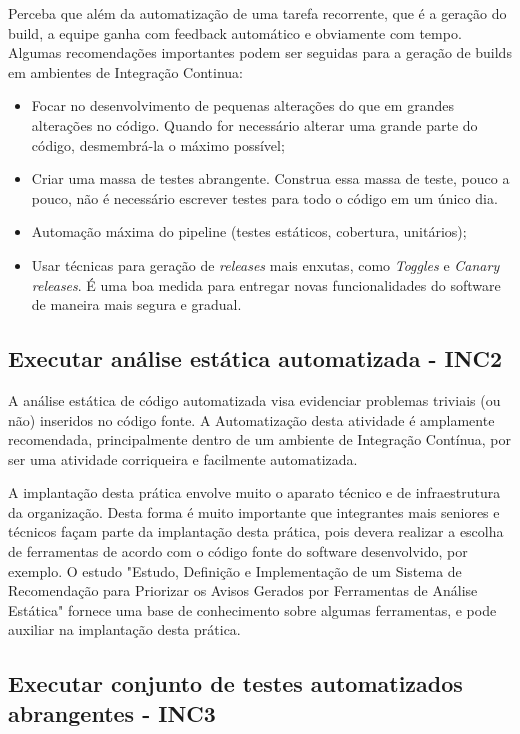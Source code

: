 Perceba que além da automatização de uma tarefa recorrente, que é a geração do build, a equipe ganha com feedback automático e obviamente com tempo. Algumas recomendações importantes podem ser seguidas para a geração de builds em ambientes de Integração Continua:

\begin{itemize}
	\item Focar no desenvolvimento de pequenas alterações do que em grandes alterações no código. Quando for necessário alterar uma grande parte do código, desmembrá-la o máximo possível;
	\item Criar uma massa de testes abrangente. Construa essa massa de teste, pouco a pouco, não é necessário escrever testes para todo o código em um único dia.
	\item Automação máxima do pipeline (testes estáticos, cobertura, unitários);
	\item Usar técnicas para geração de \textit{releases} mais enxutas, como \textit{Toggles} e \textit{Canary} \textit{releases}. É uma boa medida para entregar novas funcionalidades do software de maneira mais segura e gradual.
\end{itemize}

\subsection{Executar análise estática automatizada - INC2}

A análise estática de código automatizada visa evidenciar problemas triviais (ou não) inseridos no código fonte. A Automatização desta atividade é amplamente recomendada, principalmente dentro de um ambiente de Integração Contínua, por ser uma atividade corriqueira e facilmente automatizada. 

A implantação desta prática envolve muito o aparato técnico e de infraestrutura da organização. Desta forma é muito importante que integrantes mais seniores e técnicos façam parte da implantação desta prática, pois devera realizar a escolha de ferramentas de acordo com o código fonte do software desenvolvido, por exemplo. O estudo "Estudo, Definição e Implementação de um Sistema de Recomendação para Priorizar os Avisos Gerados por Ferramentas de Análise Estática" \cite{estudoDefinicaoAnalisEstatica} fornece uma base de conhecimento sobre algumas ferramentas, e pode auxiliar na implantação desta prática.

\subsection{Executar conjunto de testes automatizados abrangentes - INC3}

